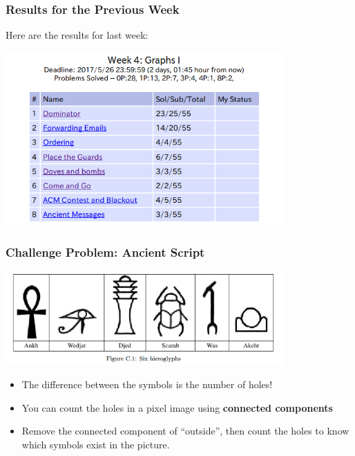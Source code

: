 \begin{frame}
  \frametitle{Results for the Previous Week}

  \begin{center}
    Here are the results for last week:

    \bigskip
    
    \includegraphics[width=0.8\textwidth]{img/resultsW4}

  \end{center}
\end{frame}

\begin{frame}
  \frametitle{Challenge Problem: Ancient Script}

  \begin{center}
    \includegraphics[width=0.8\textwidth]{img/symbols}
  \end{center}

  \bigskip
  
  \begin{itemize}
  \item The difference between the symbols is the number of holes!
  \item You can count the holes in a pixel image using {\bf connected
    components}
  \item Remove the connected component of ``outside'', then count
    the holes to know which symbols exist in the picture.
  \end{itemize}
\end{frame}

